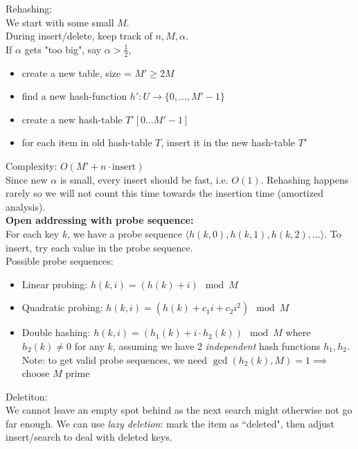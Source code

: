 \documentclass[12pt]{article}
\begin{document}
{Rehashing:\\
We start with some small $M$. \\
During insert/delete, keep track of $n, M, \alpha$. \\
If $\alpha$ gets "too big", say $\alpha > \frac{1}{2}$, 
\begin{itemize}
	\renewcommand\labelitemi{--}
	\item create a new table, size = $M' \geq 2M$
	\item find a new hash-function $h': U \rightarrow \{0,\dots, M'-1  \}$
	\item create a new hash-table $T'[0\dots M'-1]$
	\item for each item in old hash-table $T$, insert it in the new hash-table $T'$
\end{itemize}
Complexity: $O(M' + n \cdot \text{insert})$\\
Since new $\alpha$ is small, every insert should be fast, i.e. $O(1)$. Rehashing happens rarely so we will not count this time towards the insertion time (amortized analysis). \\


\textbf{Open addressing with probe sequence:}\\

For each key $k$, we have a probe sequence $\langle h(k, 0), h(k,1),h(k,2),\dots\rangle$. To insert, try each value in the probe sequence. \\
Possible probe sequences:
\begin{itemize}
	\renewcommand\labelitemi{--}
	\item Linear probing: $h(k,i) = (h(k)+i) \mod M$
	\item Quadratic probing: $h(k,i) = (h(k) + c_1i+c_2i^2) \mod M$
	\item Double hashing: $h(k,i) = (h_1(k) + i\cdot h_2(k)) \mod M$ where $h_2(k) \ne 0$ for any $k$, assuming we have 2 \emph{independent} hash functions $h_1, h_2$.\\ Note: to get valid probe sequences, we need $\gcd(h_2(k), M) = 1 \implies $ choose $M$ prime
\end{itemize}
Deletiton:\\
We cannot leave an empty spot behind as the next search might otherwise not go far enough. We can use \emph{lazy deletion}: mark the item as ``deleted", then adjust insert/search to deal with deleted keys. \\

}
\end{document}
